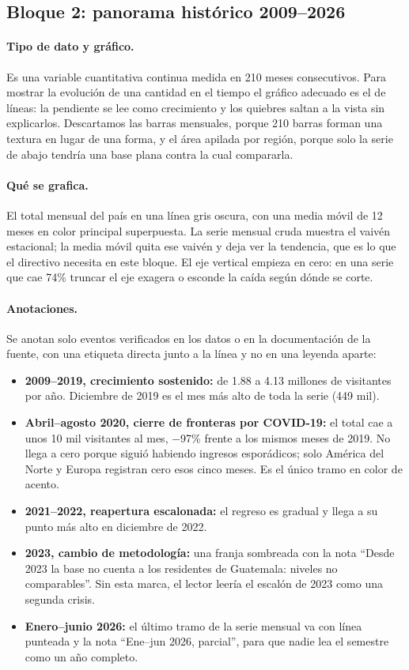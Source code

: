\subsection{Bloque 2: panorama histórico 2009--2026}

\paragraph{Tipo de dato y gráfico.} Es una variable cuantitativa continua medida
en 210 meses consecutivos. Para mostrar la evolución de una cantidad en el tiempo
el gráfico adecuado es el de líneas: la pendiente se lee como crecimiento y los
quiebres saltan a la vista sin explicarlos. Descartamos las barras mensuales,
porque 210 barras forman una textura en lugar de una forma, y el área apilada por
región, porque solo la serie de abajo tendría una base plana contra la cual
compararla.

\paragraph{Qué se grafica.} El total mensual del país en una línea gris oscura,
con una media móvil de 12 meses en color principal superpuesta. La serie mensual
cruda muestra el vaivén estacional; la media móvil quita ese vaivén y deja ver la
tendencia, que es lo que el directivo necesita en este bloque. El eje vertical
empieza en cero: en una serie que cae 74\% truncar el eje exagera o esconde
la caída según dónde se corte.

\paragraph{Anotaciones.} Se anotan solo eventos verificados en los datos o en la
documentación de la fuente, con una etiqueta directa junto a la línea y no en
una leyenda aparte:

\begin{itemize}[leftmargin=*]
  \item \textbf{2009--2019, crecimiento sostenido:} de 1.88 a 4.13 millones de
  visitantes por año. Diciembre de 2019 es el mes más alto de toda la serie
  (449 mil).
  \item \textbf{Abril--agosto 2020, cierre de fronteras por COVID-19:} el total cae
  a unos 10 mil visitantes al mes, $-$97\% frente a los mismos meses de 2019. No
  llega a cero porque siguió habiendo ingresos esporádicos; solo América del Norte
  y Europa registran cero esos cinco meses. Es el único tramo en color de acento.
  \item \textbf{2021--2022, reapertura escalonada:} el regreso es gradual y llega
  a su punto más alto en diciembre de 2022.
  \item \textbf{2023, cambio de metodología:} una franja sombreada con la nota
  ``Desde 2023 la base no cuenta a los residentes de Guatemala: niveles no
  comparables''. Sin esta marca, el lector leería el escalón de 2023 como una
  segunda crisis.
  \item \textbf{Enero--junio 2026:} el último tramo de la serie mensual va con
  línea punteada y la nota ``Ene--jun 2026, parcial'', para que nadie lea el
  semestre como un año completo.
\end{itemize}

